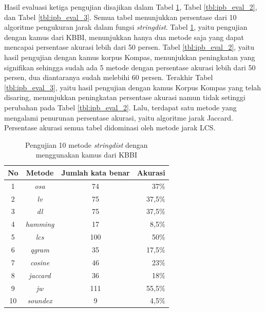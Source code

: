 Hasil evaluasi ketiga pengujian disajikan dalam Tabel \ref{tbl:ipb_eval_1}, Tabel \ref{tbl:ipb_eval_2}, dan Tabel \ref{tbl:ipb_eval_3}. Semua tabel menunjukkan persentase dari 10 algoritme pengukuran jarak dalam fungsi \textit{stringdist}. Tabel \ref{tbl:ipb_eval_1}, yaitu pengujian dengan kamus dari KBBI, menunjukkan hanya dua metode saja yang dapat mencapai persentase akurasi lebih dari 50 persen. Tabel \ref{tbl:ipb_eval_2}, yaitu hasil pengujian dengan kamus korpus Kompas, menunjukkan peningkatan yang signifikan sehingga sudah ada 5 metode dengan persentase akurasi lebih dari 50 persen, dua diantaranya sudah melebihi 60 persen. Terakhir Tabel \ref{tbl:ipb_eval_3}, yaitu hasil pengujian dengan kamus Korpus Kompas yang telah disaring, menunjukkan peningkatan persentase akurasi namun tidak setinggi perubahan pada Tabel \ref{tbl:ipb_eval_2}. Lalu, terdapat satu metode yang mengalami penurunan persentase akurasi, yaitu algoritme jarak Jaccard. Persentase akurasi semua tabel didominasi oleh metode jarak LCS.
\begin{table}[H]
	\captionsetup{justification=justified,singlelinecheck=false}
	\caption{Pengujian 10 metode \textit{stringdist} dengan menggunakan kamus dari KBBI}
    \label{tbl:ipb_eval_1}
    \centering
	\begin{tabular}{|c|c|c|r|}
		\hline
		No & Metode & Jumlah kata benar & \multicolumn{1}{c|}{Akurasi} \\ \hline
		1 & \textit{osa} & 74 & 37\% \\
		2 & \textit{lv} & 75 & 37,5\% \\
		3 & \textit{dl} & 75 & 37,5\% \\
		4 & \textit{hamming} & 17 & 8,5\% \\
		5 & \textit{lcs} & 100 & 50\% \\
		6 & \textit{qgram} & 35 & 17,5\% \\
		7 & \textit{cosine} & 46 & 23\% \\
		8 & \textit{jaccard} & 36 & 18\% \\
		9 & \textit{jw} & 111 & 55,5\% \\
		10 & \textit{soundex} & 9 & 4,5\% \\ \hline
	\end{tabular}
\end{table}

